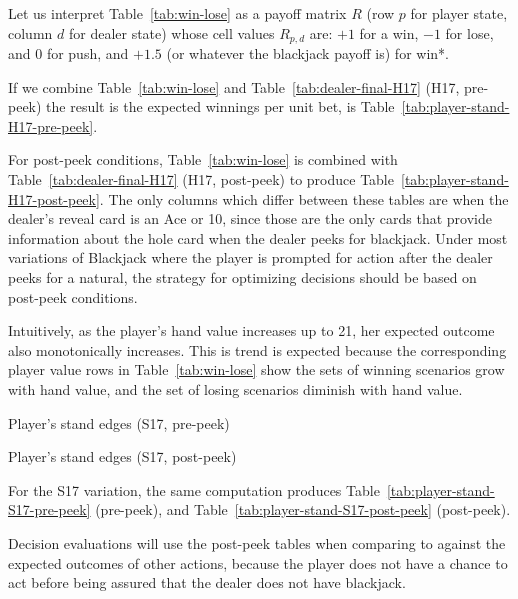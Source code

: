 Let us interpret Table~\ref{tab:win-lose} as a payoff matrix $R$
(row $p$ for player state, column $d$ for dealer state)
whose cell values $R_{p,d}$ are:
$+1$ for a win, $-1$ for lose, and $0$ for push, 
and $+1.5$ (or whatever the blackjack payoff is) for win*.

If we combine Table~\ref{tab:win-lose} and
Table~\ref{tab:dealer-final-H17} (H17, pre-peek) 
the result is the expected winnings per unit bet, 
is Table~\ref{tab:player-stand-H17-pre-peek}.

For post-peek conditions, Table~\ref{tab:win-lose} is combined with
Table~\ref{tab:dealer-final-H17} (H17, post-peek) to produce
Table~\ref{tab:player-stand-H17-post-peek}.
The only columns which differ between these tables are when
the dealer's reveal card is an Ace or 10, since those are the only cards
that provide information about the hole card
when the dealer peeks for blackjack.
Under most variations of Blackjack where the player is prompted for
action after the dealer peeks for a natural,
the strategy for optimizing decisions should be based
on post-peek conditions.  

Intuitively, as the player's hand value increases up to 21, 
her expected outcome also monotonically increases.
This is trend is expected because the corresponding player value rows in
Table~\ref{tab:win-lose} show the sets of winning scenarios
grow with hand value, and the set of losing scenarios diminish with
hand value.  

\begin{table}[ht!]
\caption{Player's stand edges (S17, pre-peek)}
\begin{center}

\end{center}
\label{tab:player-stand-S17-pre-peek}
\end{table}

\begin{table}[ht!]
\caption{Player's stand edges (S17, post-peek)}
\begin{center}

\end{center}
\label{tab:player-stand-S17-post-peek}
\end{table}

For the S17 variation, the same computation produces
Table~\ref{tab:player-stand-S17-pre-peek} (pre-peek), and
Table~\ref{tab:player-stand-S17-post-peek} (post-peek).

Decision evaluations will use the post-peek tables when
comparing to against the expected outcomes of other actions, 
because the player does not have a chance to act before
being assured that the dealer does not have blackjack.  

